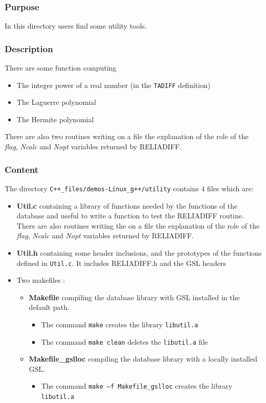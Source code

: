 \documentclass[10pt]{article}
\begin{document}
\subsubsection{Purpose}
In this directory users find some utility tools.

\subsubsection{Description}

There are some function computing
\begin{itemize}
 \item The integer power of a real number (in the {\tt TADIFF} definition)
 \item The Laguerre polynomial
 \item The Hermite polynomial
\end{itemize}

There are also two routines writing on a file the explanation of the role of the \emph{flag}, \emph{Ncalc} and \emph{Nopt} variables returned by RELIADIFF.

\subsubsection{Content}

The directory {\tt C++\_files/demos-Linux\_g++/utility} contains 4 files which are:
\begin{itemize}
	\item \textbf{Util.c}	containing a library of functions needed by the functions of the database and useful to write a function to test the RELIADIFF routine. There are also routines writing the on a file the explanation of the role of the \emph{flag}, \emph{Ncalc} and \emph{Nopt} variables returned by RELIADIFF.
	\item \textbf{Util.h}	containing some header inclusions, and the prototypes of the functions defined in {\tt Util.c}. It includes RELIADIFF.h and the GSL headers
	\item Two makefiles :
		\begin{itemize}
		\item \textbf{Makefile} compiling the database library with GSL installed in the default path.
		      \begin{itemize}
		      \item The command {\tt make} creates the library {\tt libutil.a}
		      \item The command {\tt make clean} deletes the {\tt libutil.a} file
		      \end{itemize}
		\item \textbf{Makefile\_gslloc} compiling the database library with a locally installed GSL.
		      \begin{itemize}
		      \item The command {\tt make –f Makefile\_gslloc} creates the library {\tt libutil.a}
		      \end{itemize}
		\end{itemize}
\end{itemize}
\end{document}
